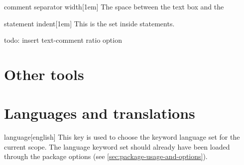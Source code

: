 \documentclass[a4paper, 11pt]{article}
\begin{document}
\begin{option}{comment separator width}{}[1em]
    The space between the text box and the 
\end{option}

\begin{option}{statement indent}{}[1em]
    This is the  set inside  statements.
\end{option}

\begin{comment}
    parameter indent = 0pt,
\end{comment}

todo: insert text-comment ratio option

%


\section{Other tools}


\section{Languages and translations}\label{sec:languages-and-translations}

\begin{option}{language}{}[english]
    This key is used to choose the keyword language set for the current scope. The language keyword set should already have been loaded through the package options (see \cref{sec:package-usage-and-options}).
\end{option}
\end{document}
